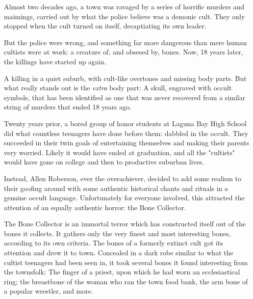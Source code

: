 \documentclass{motw}
\begin{document}




Almost two decades ago, a town was ravaged by a series of horrific murders and maimings, carried out by what the police believe was a demonic cult.  They only stopped when the cult turned on itself, decaptiating its own leader.  

But the police were wrong, and something far more dangerous than mere human cultists were at work: a creature of, and obsesed by, bones.  Now, 18 years later, the killings have started up again.


A killing in a quiet suburb, with cult-like overtones and missing body parts.  But what really stands out is the \emph{extra} body part:  A skull, engraved with occult symbols, that has been identified as one that was never recovered from a similar string of murders that ended 18 years ago.


Twenty years prior, a bored group of honor students at Laguna Bay High School did what countless teenagers have done before them:  dabbled in the occult.  They succeeded in their twin goals of entertaining themselves and making their parents very worried.  Likely it would have ended at graduation, and all the "cultists" would have gone on college and then to productive suburban lives.

Instead, Allen Roberson, ever the overachiever, decided to add some realism to their goofing around with some authentic historical chants and rituals in a genuine occult language.  Unfortunately for everyone involved, this attracted the attention of an equally authentic horror: the Bone Collector.

The Bone Collector is an immortal terror which has constructed itself out of the bones it collects.  It gathers only the very finest and most interesting bones, according to its own criteria.  The bones of a formerly extinct cult got its attention and drew it to town.  Concealed in a dark robe similar to what the cultist teenagers had been seen in, it took several bones it found interesting from the townsfolk:  The finger of a priest, upon which he had worn an ecclesiastical ring; the breastbone of the woman who ran the town food bank, the arm bone of a popular wrestler, and more.  
\end{document}

